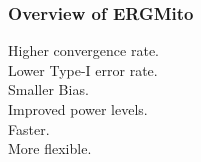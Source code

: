 \documentclass[aspectratio=169, 9pt]{beamer}
\begin{document}
% 
% 
% 

\begin{frame}[c,label=ergmito-checklist]
\frametitle{Overview of ERGMito}
 Higher convergence rate.\\
 Lower Type-I error rate.\\
 Smaller Bias.\\
 Improved power levels.\\
 Faster.\\
 More flexible.
\vfill\hfill\hyperlink{ergmito-simulations}{}
\end{frame}
\end{document}
